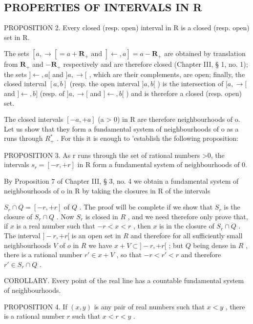 \subsection{PROPERTIES OF INTERVALS IN R}

PROPOSITION 2. Every closed (resp. open) interval in R is a closed (resp. open) set in R.

The sets \([a, \rightarrow[ = a + \mathbf{R}_+ \text{ and } ]\leftarrow, a] = a - \mathbf{R}_+\) are obtained by translation from \(\mathbf{R}_+\) and \(-\mathbf{R}_+\) respectively and are therefore closed (Chapter III, § 1, no. 1); the sets \(]\leftarrow, a[\) and \(]a, \rightarrow[\) , which are their complements, are open; finally, the closed interval \([a, b]\) (resp. the open interval \(]a, b[\) ) is the intersection of \([a, \rightarrow[\) and \(]\leftarrow, b]\) (resp. of \(]a, \rightarrow[\) and \(]\leftarrow, b[\) ) and is therefore a closed (resp. open) set.

The closed intervals \([-a, +a]\) (a \textgreater{} 0) in R are therefore neighbourhoods of o. Let us show that they form a fundamental system of neighbourhoods of o as a runs through \(R_{+}^{*}\) . For this it is enough to 'establish the following proposition:

PROPOSITION 3. As r runs through the set of rational numbers \textgreater0, the intervals \(s_{r} = [-r, +r]\) in R form a fundamental system of neighbourhoods of 0.

By Proposition 7 of Chapter III, § 3, no. 4 we obtain a fundamental system of neighbourhoods of o in R by taking the closures in R of the intervals

\(S_{r} \cap Q = [-r, +r]\) of \(Q\) . The proof will be complete if we show that \(S_{r}\) is the closure of \(S_{r} \cap Q\) . Now \(S_{r}\) is closed in \(R\) , and we need therefore only prove that, if \(x\) is a real number such that \(-r < x < r\) , then \(x\) is in the closure of \(S_{r} \cap Q\) . The interval \(]-r, +r[\) is an open set in \(R\) and therefore for all sufficiently small neighbourhoods \(V\) of \(o\) in \(R\) we have \(x + V \subset ]-r, +r[\) ; but \(Q\) being dense in \(R\) , there is a rational number \(r' \in x + V\) , so that \(-r < r' < r\) and therefore \(r' \in S_{r} \cap Q\) .

COROLLARY. Every point of the real line has a countable fundamental system of neighbourhoods.

PROPOSITION 4. If \((x, y)\) is any pair of real numbers such that \(x < y\) , there is a rational number \(r\) such that \(x < r < y\) .

